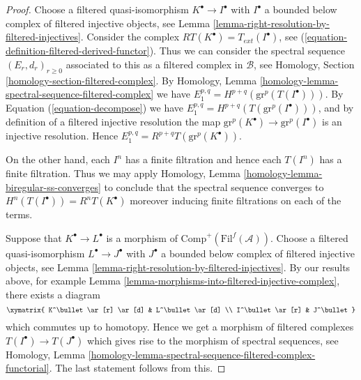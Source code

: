 \begin{proof}
Choose a filtered quasi-isomorphism $K^\bullet \to I^\bullet$
with $I^\bullet$ a bounded below complex of filtered injective objects, see
Lemma \ref{lemma-right-resolution-by-filtered-injectives}.
Consider the complex $RT(K^\bullet) = T_{ext}(I^\bullet)$, see
(\ref{equation-definition-filtered-derived-functor}).
Thus we can consider the spectral sequence
$(E_r, d_r)_{r \geq 0}$ associated to
this as a filtered complex in $\mathcal{B}$, see
Homology, Section \ref{homology-section-filtered-complex}.
By
Homology, Lemma \ref{homology-lemma-spectral-sequence-filtered-complex}
we have $E_1^{p, q} = H^{p + q}(\text{gr}^p(T(I^\bullet)))$.
By Equation (\ref{equation-decompose}) we have
$E_1^{p, q} = H^{p + q}(T(\text{gr}^p(I^\bullet)))$, and
by definition of a filtered injective resolution the
map $\text{gr}^p(K^\bullet) \to \text{gr}^p(I^\bullet)$
is an injective resolution. Hence
$E_1^{p, q} = R^{p + q}T(\text{gr}^p(K^\bullet))$.

\medskip\noindent
On the other hand, each $I^n$ has a finite filtration and hence
each $T(I^n)$ has a finite filtration. Thus we may apply
Homology, Lemma \ref{homology-lemma-biregular-ss-converges}
to conclude that the
spectral sequence converges to $H^n(T(I^\bullet)) = R^nT(K^\bullet)$
moreover inducing finite filtrations on each of the terms.

\medskip\noindent
Suppose that $K^\bullet \to L^\bullet$ is a morphism of
$\text{Comp}^{+}(\text{Fil}^f(\mathcal{A}))$.
Choose a filtered quasi-isomorphism $L^\bullet \to J^\bullet$
with $J^\bullet$ a bounded below complex of filtered injective
objects, see
Lemma \ref{lemma-right-resolution-by-filtered-injectives}.
By our results above,
for example
Lemma \ref{lemma-morphisms-into-filtered-injective-complex},
there exists a diagram
$$
\xymatrix{
K^\bullet \ar[r] \ar[d] & L^\bullet \ar[d] \\
I^\bullet \ar[r] & J^\bullet
}
$$
which commutes up to homotopy. Hence we get a morphism of filtered
complexes $T(I^\bullet) \to T(J^\bullet)$ which gives rise to the
morphism of spectral sequences, see
Homology,
Lemma \ref{homology-lemma-spectral-sequence-filtered-complex-functorial}.
The last statement follows from this.
\end{proof}

